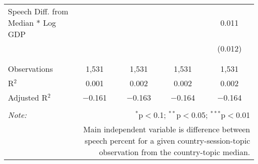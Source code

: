 \begin{table}[!htbp]
\begin{tabular}{@{\extracolsep{5pt}}lcccc}
 Speech Diff. from Median * Log GDP &  &  &  & 0.011 \\ 
  &  &  &  & (0.012) \\ 
  & & & & \\ 
\hline \\[-1.8ex] 
Observations & 1,531 & 1,531 & 1,531 & 1,531 \\ 
R$^{2}$ & 0.001 & 0.002 & 0.002 & 0.002 \\ 
Adjusted R$^{2}$ & $-$0.161 & $-$0.163 & $-$0.164 & $-$0.164 \\ 
\hline 
\hline \\[-1.8ex] 
\textit{Note:}  & \multicolumn{4}{r}{$^{*}$p$<$0.1; $^{**}$p$<$0.05; $^{***}$p$<$0.01} \\ 
 & \multicolumn{4}{r}{Main independent variable is difference between speech percent for a given country-session-topic observation from the country-topic median.} \\ 
\end{tabular} 
\end{table} 
